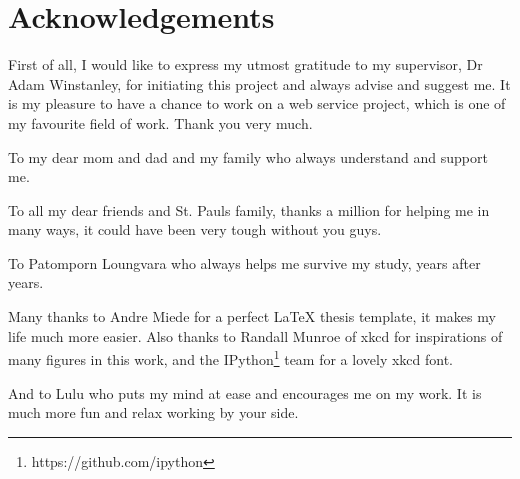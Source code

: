 

%


\begingroup

\let\clearpage\relax
\let\cleardoublepage\relax
\let\cleardoublepage\relax

\chapter*{Acknowledgements} %

First of all, I would like to express my utmost gratitude to my supervisor,
Dr Adam Winstanley, for initiating this project and always advise
and suggest me. It is my pleasure to have a chance to work on
a web service project, which is one of my favourite field of work.
Thank you very much.

To my dear mom and dad and my family who always understand and support me.

To all my dear friends and St. Pauls family, thanks a million for
helping me in many ways, it could have been very tough without you guys.

To Patomporn Loungvara who always helps me survive my study,
years after years.

Many thanks to Andre Miede for a perfect \LaTeX \xspace thesis template,
it makes my life much more easier. Also thanks to Randall Munroe of xkcd
for inspirations of many figures in this work, and the
IPython\footnote{https://github.com/ipython} team for a lovely
xkcd font.

And to Lulu who puts my mind at ease and encourages me on my work.
It is much more fun and relax working by your side.

\endgroup
